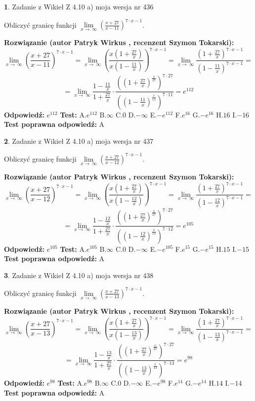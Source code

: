 \documentclass[12pt, a4paper]{article}
\theoremstyle{definition} %
\newtheorem{zad}{}
\newcommand{\zadStart}[1]{\begin{zad}#1\newline}
\newcommand{\zadStop}{\end{zad}}
\newcommand{\rozwStart}[2]{\noindent \textbf{Rozwiązanie (autor #1 , recenzent #2): }\newline}
\newcommand{\rozwStop}{\newline}
\newcommand{\odpStart}{\noindent \textbf{Odpowiedź:}\newline}
\newcommand{\odpStop}{\newline}
\newcommand{\testStart}{\noindent \textbf{Test:}\newline}
\newcommand{\testStop}{\newline}
\newcommand{\kluczStart}{\noindent \textbf{Test poprawna odpowiedź:}\newline}
\newcommand{\kluczStop}{\newline}
\begin{document}
\zadStart{Zadanie z Wikieł Z 4.10 a) moja wersja nr 436}

Obliczyć granicę funkcji  $\lim\limits_{x\to\ \infty}(\frac{x+27}{x-11})^{7\cdot x-1}$.
\zadStop
\rozwStart{Patryk Wirkus}{Szymon Tokarski}
$$\lim\limits_{x\to\ \infty}(\frac{x+27}{x-11})^{7\cdot x-1} = \lim\limits_{x\to\ \infty}(\frac{x(1+\frac{27}{x})}{x(1-\frac{11}{x})})^{7\cdot x-1}=\lim\limits_{x\to\ \infty}\frac{(1+\frac{27}{x})^{7\cdot x-1}}{(1-\frac{11}{x})^{7\cdot x-1}}=$$
$$=\lim\limits_{x\to\ \infty}\frac{1-\frac{11}{x}}{1+\frac{27}{x}}\cdot\frac{((1+\frac{27}{x})^{\frac{x}{27}})^{7\cdot27}}{((1-\frac{11}{x})^{\frac{x}{11}})^{7\cdot11}}=e^{112}$$
\rozwStop
\odpStart
$e^{112}$
\odpStop
\testStart
A.$e^{112}$ B.$\infty$ C.$0$ D.$-\infty$ E.$-e^{112}$
F.$e^{16}$ G.$-e^{16}$
H.$16$
I.$-16$
\testStop
\kluczStart
A
\kluczStop



\zadStart{Zadanie z Wikieł Z 4.10 a) moja wersja nr 437}

Obliczyć granicę funkcji  $\lim\limits_{x\to\ \infty}(\frac{x+27}{x-12})^{7\cdot x-1}$.
\zadStop
\rozwStart{Patryk Wirkus}{Szymon Tokarski}
$$\lim\limits_{x\to\ \infty}(\frac{x+27}{x-12})^{7\cdot x-1} = \lim\limits_{x\to\ \infty}(\frac{x(1+\frac{27}{x})}{x(1-\frac{12}{x})})^{7\cdot x-1}=\lim\limits_{x\to\ \infty}\frac{(1+\frac{27}{x})^{7\cdot x-1}}{(1-\frac{12}{x})^{7\cdot x-1}}=$$
$$=\lim\limits_{x\to\ \infty}\frac{1-\frac{12}{x}}{1+\frac{27}{x}}\cdot\frac{((1+\frac{27}{x})^{\frac{x}{27}})^{7\cdot27}}{((1-\frac{12}{x})^{\frac{x}{12}})^{7\cdot12}}=e^{105}$$
\rozwStop
\odpStart
$e^{105}$
\odpStop
\testStart
A.$e^{105}$ B.$\infty$ C.$0$ D.$-\infty$ E.$-e^{105}$
F.$e^{15}$ G.$-e^{15}$
H.$15$
I.$-15$
\testStop
\kluczStart
A
\kluczStop



\zadStart{Zadanie z Wikieł Z 4.10 a) moja wersja nr 438}

Obliczyć granicę funkcji  $\lim\limits_{x\to\ \infty}(\frac{x+27}{x-13})^{7\cdot x-1}$.
\zadStop
\rozwStart{Patryk Wirkus}{Szymon Tokarski}
$$\lim\limits_{x\to\ \infty}(\frac{x+27}{x-13})^{7\cdot x-1} = \lim\limits_{x\to\ \infty}(\frac{x(1+\frac{27}{x})}{x(1-\frac{13}{x})})^{7\cdot x-1}=\lim\limits_{x\to\ \infty}\frac{(1+\frac{27}{x})^{7\cdot x-1}}{(1-\frac{13}{x})^{7\cdot x-1}}=$$
$$=\lim\limits_{x\to\ \infty}\frac{1-\frac{13}{x}}{1+\frac{27}{x}}\cdot\frac{((1+\frac{27}{x})^{\frac{x}{27}})^{7\cdot27}}{((1-\frac{13}{x})^{\frac{x}{13}})^{7\cdot13}}=e^{98}$$
\rozwStop
\odpStart
$e^{98}$
\odpStop
\testStart
A.$e^{98}$ B.$\infty$ C.$0$ D.$-\infty$ E.$-e^{98}$
F.$e^{14}$ G.$-e^{14}$
H.$14$
I.$-14$
\testStop
\kluczStart
A
\kluczStop
\end{document}
